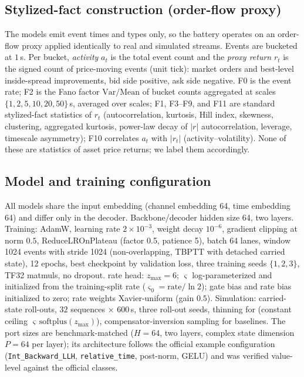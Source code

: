 \subsection{Stylized-fact construction (order-flow proxy)}
The models emit event times and types only, so the battery operates on an
order-flow proxy applied identically to real and simulated streams. Events
are bucketed at $1$\,s. Per bucket, \emph{activity} $a_t$ is the total
event count and the \emph{proxy return} $r_t$ is the signed count of
price-moving events (unit tick): market orders and best-level inside-spread
improvements, bid side positive, ask side negative. F0 is the event rate;
F2 is the Fano factor $\mathrm{Var}/\mathrm{Mean}$ of bucket counts
aggregated at scales $\{1,2,5,10,20,50\}$\,s, averaged over scales; F1, F3--F9,
and F11 are standard stylized-fact statistics of $r_t$ (autocorrelation,
kurtosis, Hill index, skewness, clustering, aggregated kurtosis, power-law
decay of $|r|$ autocorrelation, leverage, timescale asymmetry); F10
correlates $a_t$ with $|r_t|$ (activity--volatility). None of these are
statistics of asset price returns; we label them accordingly.

\subsection{Model and training configuration}
All models share the input embedding (channel embedding 64, time embedding
64) and differ only in the decoder. Backbone/decoder hidden size 64, two
layers. Training: AdamW, learning rate $2\times10^{-3}$, weight decay
$10^{-6}$, gradient clipping at norm $0.5$, ReduceLROnPlateau (factor 0.5,
patience 5), batch 64 lanes, window 1024 events with stride 1024
(non-overlapping, TBPTT with detached carried state), 12 epochs, best
checkpoint by validation loss, three training seeds $\{1,2,3\}$, TF32
matmuls, no dropout. \ssppp{} rate head: $z_{\max}=6$; $\varsigma$
log-parameterized and initialized from the training-split rate
($\varsigma_0=\text{rate}/\ln 2$); gate bias and rate bias initialized to
zero; rate weights Xavier-uniform (gain $0.5$). Simulation: carried-state
roll-outs, $32$ sequences $\times$ $600$\,s, three roll-out seeds, thinning
for \ssppp{} (constant ceiling $\varsigma\,\mathrm{softplus}(z_{\max})$),
compensator-inversion sampling for baselines. The \spppub{} port sizes are
benchmark-matched ($H{=}64$, two layers, complex state dimension $P{=}64$
per layer); its architecture follows the official example configuration
(\texttt{Int\_Backward\_LLH}, \texttt{relative\_time}, post-norm, GELU) and
was verified value-level against the official classes.

